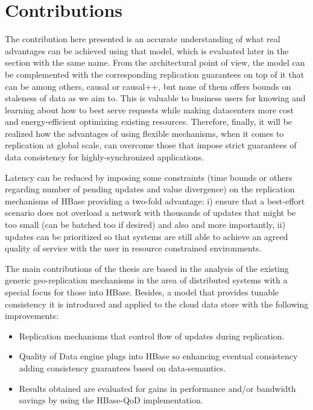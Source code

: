 \section{Contributions}
The contribution here presented is an accurate understanding of what real advantages can be achieved using that model, which is evaluated later in the section with the same name.  From the architectural point of view, the model can be complemented with the corresponding replication guarantees on top of it that can be among others, causal or causal++, but none of them offers bounds on staleness of data as we aim to. This is valuable to business users for knowing and learning about how to best serve requests while making datacenters more cost and energy-efficient optimizing existing resources. Therefore, finally, it will be realized how the advantages of using flexible mechanisms, when it comes to replication at global scale, can overcome those that impose strict guarantees of data consistency for highly-synchronized applications.


Latency can be reduced by imposing some constraints (time bounds or others regarding number of pending updates and value divergence) on the replication mechanisms of HBase providing a two-fold advantage: i) ensure that a best-effort scenario does not overload a network with thousands of updates that might be too small (can be batched too if desired) and also and more importantly, ii) updates can be prioritized so that systems are still able to achieve an agreed quality of service with the user in resource constrained environments.



The main contributions of the thesis are based in the analysis of the existing generic geo-replication mechanisms in the area of distributed systems with a special focus for those into HBase. Besides, a model that provides tunable consistency it is introduced and applied to the cloud data store with the following improvements:
\begin{itemize}
\item Replication mechanisms that control flow of updates during replication.
\item Quality of Data engine plugs into HBase so enhancing eventual consistency adding consistency guarantees based on data-semantics.
\item Results obtained are evaluated for gains in performance and/or bandwidth savings by using the HBase-QoD implementation.
\end{itemize}

